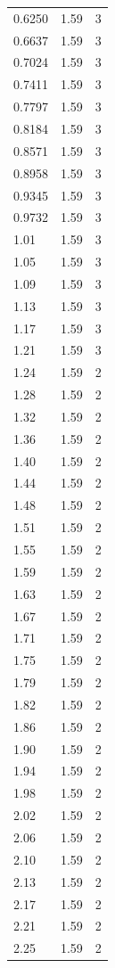 \begin{longtable}{lrr}
  0.6250 & 1.59 & 3 \\
  0.6637 & 1.59 & 3 \\
  0.7024 & 1.59 & 3 \\
  0.7411 & 1.59 & 3 \\
  0.7797 & 1.59 & 3 \\
  0.8184 & 1.59 & 3 \\
  0.8571 & 1.59 & 3 \\
  0.8958 & 1.59 & 3 \\
  0.9345 & 1.59 & 3 \\
  0.9732 & 1.59 & 3 \\
  1.01 & 1.59 & 3 \\
  1.05 & 1.59 & 3 \\
  1.09 & 1.59 & 3 \\
  1.13 & 1.59 & 3 \\
  1.17 & 1.59 & 3 \\
  1.21 & 1.59 & 3 \\
  1.24 & 1.59 & 2 \\
  1.28 & 1.59 & 2 \\
  1.32 & 1.59 & 2 \\
  1.36 & 1.59 & 2 \\
  1.40 & 1.59 & 2 \\
  1.44 & 1.59 & 2 \\
  1.48 & 1.59 & 2 \\
  1.51 & 1.59 & 2 \\
  1.55 & 1.59 & 2 \\
  1.59 & 1.59 & 2 \\
  1.63 & 1.59 & 2 \\
  1.67 & 1.59 & 2 \\
  1.71 & 1.59 & 2 \\
  1.75 & 1.59 & 2 \\
  1.79 & 1.59 & 2 \\
  1.82 & 1.59 & 2 \\
  1.86 & 1.59 & 2 \\
  1.90 & 1.59 & 2 \\
  1.94 & 1.59 & 2 \\
  1.98 & 1.59 & 2 \\
  2.02 & 1.59 & 2 \\
  2.06 & 1.59 & 2 \\
  2.10 & 1.59 & 2 \\
  2.13 & 1.59 & 2 \\
  2.17 & 1.59 & 2 \\
  2.21 & 1.59 & 2 \\
  2.25 & 1.59 & 2 \\

\end{longtable}

